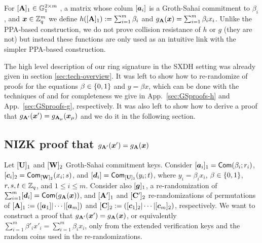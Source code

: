 
For $[\mathbf{{A}}]_1\in\mathbb{G}_1^{2\times m}$ , a matrix whose colum $[{\boldsymbol{a}}_i]$ is a Groth-Sahai commitment to $\beta_i$, and ${\boldsymbol{x}}\in\mathbb{Z}_q^m$ we define $h([\mathbf{{A}}]_1) := \sum_{i=1}^m \beta_i$ and $g_{\mathbf{{A}}}({\boldsymbol{x}}) = \sum_{i=1}^m \beta_i x_i$. Unlike the PPA-based construction, we do not prove collision resistance of $h$ or $g$ (they are not) but instead these functions are only used as an intuitive link with the simpler PPA-based construction.

The high level description of our ring signature in the SXDH setting was already given in section \ref{sec:tech-overview}. It was left to show how to re-randomize of proofs for the equations $\beta\in\{0,1\}$ and $y = \beta x$,  which can be done with the techniques of \cite{C:BCCKLS09} and for completeness we give in App.~\ref{sec:GSproofs-h} and App.~\ref{sec:GSproofs-g}, respectively. It was also left to show how to derive a proof that $g_{\mathbf{{A}}'}({\boldsymbol{x}}') = g_{\mathbf{{A}}_\mu}({\boldsymbol{x}}_\mu)$ and we do it in the following section.

\subsection{NIZK proof that $g_{\mathbf{{A}}'}({\boldsymbol{x}}') = g_{\mathbf{{A}}}({\boldsymbol{x}})$}
Let $[\mathbf{{U}}]_1$ and $[\mathbf{{W}}]_2$ Groth-Sahai commitment keys. Consider $[{\boldsymbol{a}}_i]_1 = \mathsf{Com}(\beta_i;r_i)$, $[{\boldsymbol{c}}_i]_2 = \mathsf{Com}_{[\mathbf{{W}}]_2}(x_i;s)$, and $[{\boldsymbol{d}}_i] = \mathsf{Com}_{[\mathbf{{U}}]_1}(y_i;t)$, where $y_i=\beta_ix_i$, $\beta\in\{0,1\}$, $r,s,t\in\mathbb{Z}_q$, and $1\leq i\leq m$. Consider also $[{\boldsymbol{g}}]_1$, a re-randomization of $\sum_{i=1}^m [{\boldsymbol{d}}_i] = \mathsf{Com}(g_{\mathbf{{A}}}({\boldsymbol{x}}))$, and $[\mathbf{{A}}']_1$ and $[\mathbf{{C}}']_2$ re-randomizations of permutations of $[\mathbf{{A}}]_1 := ([{\boldsymbol{a}}_1]|\cdots|[{\boldsymbol{a}}_m])$ and $[\mathbf{{C}}]_2 := ([{\boldsymbol{c}}_1]_2|\cdots|[{\boldsymbol{c}}_m]_2)$, respectively. We want to construct a proof that $g_{\mathbf{{A}}'}({\boldsymbol{x}}') = g_{\mathbf{{A}}}({\boldsymbol{x}})$, or equivalently $\sum_{i=1}^m \beta'_ix'_i = \sum_{i=1}^m \beta_i x_i$, only from the extended verification keys and the random coins used in the re-randomizations.


